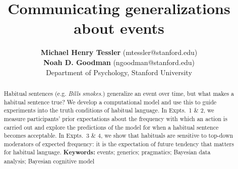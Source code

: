 \documentclass[10pt,letterpaper]{article}
\title{Communicating generalizations about events}
\author{{\large \bf Michael Henry Tessler} (mtessler@stanford.edu) \\
 {\large \bf Noah D. Goodman} (ngoodman@stanford.edu) \\
  Department of Psychology, Stanford University}
\newcommand{\ndg}[1]{\textcolor{Green}{[ndg: #1]}}
\begin{document}
\maketitle


\begin{abstract}
Habitual sentences (e.g. \emph{Bills smokes.}) generalize an event over time, but what makes a habitual sentence true?
We develop a computational model and use this to guide experiments into the truth conditions of habitual language.
In Expts.~1 \& 2, we measure participants' prior expectations about the frequency with which an action is carried out and explore the predictions of the model for when a habitual sentence becomes acceptable.
In Expts.~3 \& 4, we show that habituals are sensitive to top-down moderators of expected frequency: it is the expectation of future tendency that matters for habitual language.
\textbf{Keywords:} 
events; generics; pragmatics; Bayesian data analysis; Bayesian cognitive model
\end{abstract}
\end{document}
